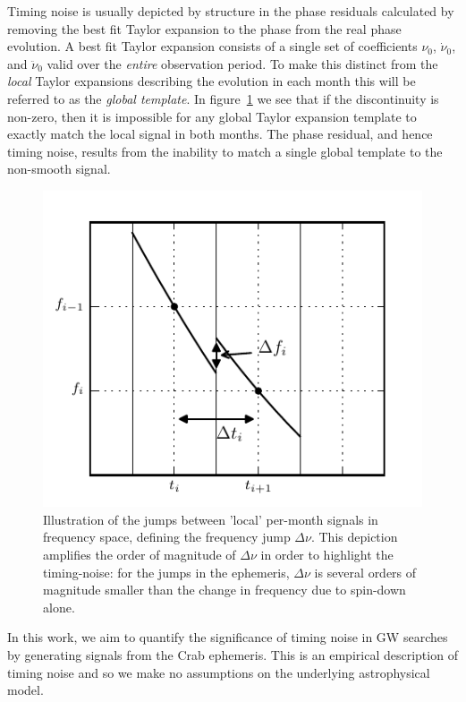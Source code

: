 \documentclass[../full_thesis/full_thesis.tex]{subfiles}
\begin{document}
Timing noise is usually depicted by structure in the phase residuals calculated
by removing the best fit Taylor expansion to the phase from the real phase
evolution. A best fit Taylor expansion consists of a single set of coefficients
$\nu_{0}$, $\dot{\nu}_{0}$, and $\ddot{\nu}_{0}$ valid over the \emph{entire}
observation period. To make this distinct from the \emph{local} Taylor
expansions describing the evolution in each month this will be referred to as
the \emph{global template}.  In figure~\ref{fig: template jumps} we see that if
the discontinuity is non-zero, then it is impossible for any global Taylor
expansion template to exactly match the local signal in both months. The
phase residual, and hence timing noise, results from the inability to match a
single global template to the non-smooth signal.

\begin{figure}[htb]
\centering
    \includegraphics{template_jumps}
\caption{Illustration of the jumps between 'local' per-month signals in
    frequency space, defining the frequency jump $\Delta \nu$. This
        depiction amplifies the order of magnitude of $\Delta \nu$ in order to
        highlight the timing-noise: for the jumps in the ephemeris, $\Delta \nu$
        is several orders of magnitude smaller than the change in frequency
        due to spin-down alone.}
\label{fig: template jumps}
\end{figure}

In this work, we aim to quantify the significance of timing
noise in GW searches by generating signals from the Crab ephemeris. This
is an empirical description of timing noise and so we
make no assumptions on the underlying astrophysical model.
\end{document}
